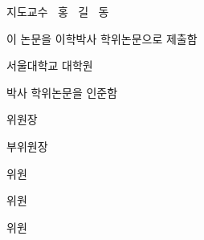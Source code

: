 \clearpage

\begin{center}
    
{\Large \quad \par}
\vspace{.1cm}
{\fontsize{20}{30bp}\selectfont \tTitleEnglish \par}
\vfill
{\Large 지도교수 $\ $ 홍 $\ $ 길 $\ $ 동 \par}
\vspace{1cm}
{\Large 이 논문을 이학박사 학위논문으로 제출함 \par}
\vspace{.2cm}
{\Large \tDate \par}

\vspace{.9cm}
{\Large 서울대학교 대학원 \par}
\vspace{.2cm}
{\Large \tDepartmentKorean \par}
\vspace{.2cm}
{\Large \tNameKor \par}
\vspace{.9cm}

{\Large {} 박사 학위논문을 인준함 \par}
\vspace{.1cm}
{\Large \tDate \par}

\vspace{1.2cm}
{\Large 위\hspace{.255cm}원\hspace{.255cm}장}  \par
\vspace{.3cm}
{\Large 부위원장}  \par
\vspace{.3cm}
{\Large 위\hspace{1cm}원}  \par
\vspace{.3cm}
{\Large 위\hspace{1cm}원}  \par
\vspace{.3cm}
{\Large 위\hspace{1cm}원}  \par 

\end{center}
